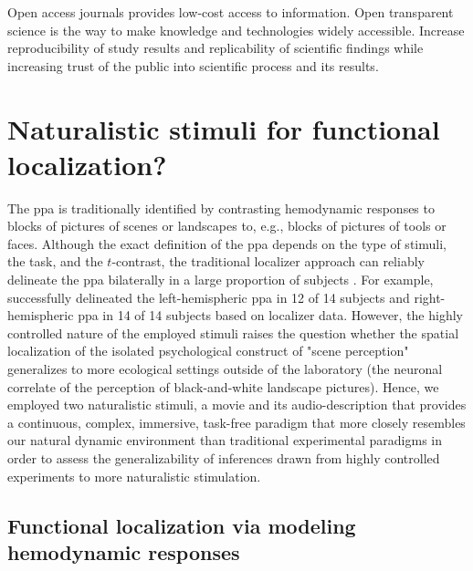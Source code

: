 %
Open access journals provides low-cost access to information.
%
Open transparent science is the way to make knowledge and technologies
widely accessible.
%
Increase reproducibility of study results and replicability of scientific
findings while increasing trust of the public into scientific process and its
results.



\pagebreak



\section{Naturalistic stimuli for functional localization?}


%
The \ac{ppa} is traditionally identified by contrasting hemodynamic responses to
blocks of pictures of scenes or landscapes to, e.g., blocks of pictures of tools
or faces.
%
Although the exact definition of the \ac{ppa} depends on the type of stimuli,
the task, and the $t$-contrast, the traditional localizer approach can reliably
delineate the \ac{ppa} bilaterally in a large proportion of subjects
\citep[e.g.,][]{zhen2017quantifying}.
%
For example, \citet{sengupta2016extension} successfully delineated the
left-hemispheric \ac{ppa} in 12 of 14 subjects and right-hemispheric \ac{ppa} in
14 of 14 subjects based on localizer data.
%
However, the highly controlled nature of the employed stimuli raises the
question whether the spatial localization of the isolated psychological
construct of "scene perception" generalizes to more ecological settings outside
of the laboratory (the neuronal correlate of the perception of black-and-white
landscape pictures).
%
Hence, we employed two naturalistic stimuli, a movie and its audio-description
that provides a continuous, complex, immersive, task-free paradigm that more
closely resembles our natural dynamic environment than traditional experimental
paradigms in order to assess the generalizability of inferences drawn from
highly controlled experiments to more naturalistic stimulation.



\subsection{Functional localization via modeling hemodynamic responses}

